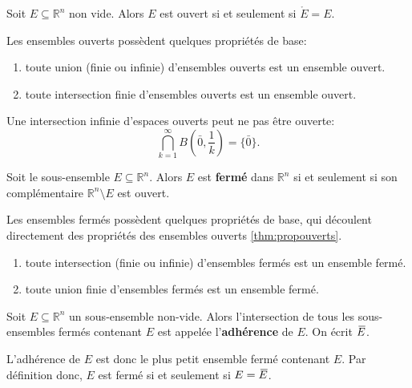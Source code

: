 \documentclass{report}
\newcommand*{\skol}[2][3]{{}\mkern#1mu\overline{\mkern-#1mu#2}} %
\newcommand*\adh[1]{\skol{#1}}
\newcommand*{\interior}[1]{\mathring{#1}}
\begin{document}
\begin{thm}
	Soit $E \subseteq \mathbb R^n$ non vide. Alors $E$ est ouvert si et seulement si $\interior E = E$.
\end{thm}

\label{thm:propouverts}\begin{thm} Les ensembles ouverts possèdent quelques propriétés de base:
	\begin{enumerate}
		\item toute union (finie ou infinie) d'ensembles ouverts est un ensemble ouvert.
		\item toute intersection finie d'ensembles ouverts est un ensemble ouvert.
	\end{enumerate}
\end{thm}

\begin{exmp}
	Une intersection infinie d'espaces ouverts peut ne pas être ouverte:
	\begin{equation*}
		\bigcap_{k = 1}^\infty B(\bar 0, \frac1k) = \{\bar 0\}.
	\end{equation*}
\end{exmp}

\begin{defn}
	Soit le sous-ensemble $E \subseteq \mathbb R^n$. Alors $E$ est \textbf{fermé} dans $\mathbb R^n$ si et seulement si son complémentaire $\mathbb R^n \setminus E$ est ouvert.
\end{defn}

\begin{thm} Les ensembles fermés possèdent quelques propriétés de base, qui découlent directement des propriétés des ensembles ouverts \eqref{thm:propouverts}.
	\begin{enumerate}
		\item toute intersection (finie ou infinie) d'ensembles fermés est un ensemble fermé.
		\item toute union finie d'ensembles fermés est un ensemble fermé.
	\end{enumerate}
\end{thm}

\begin{defn}
	Soit $E \subseteq \mathbb R^n$ un sous-ensemble non-vide. Alors l'intersection de tous les sous-ensembles fermés contenant $E$ est appelée l'\textbf{adhérence} de $E$. On écrit $\adh E$.
\end{defn}
\begin{remark} L'adhérence de $E$ est donc le plus petit ensemble fermé contenant $E$. Par définition donc, $E$ est fermé si et seulement si $E = \adh E$.\end{remark}
\end{document}
